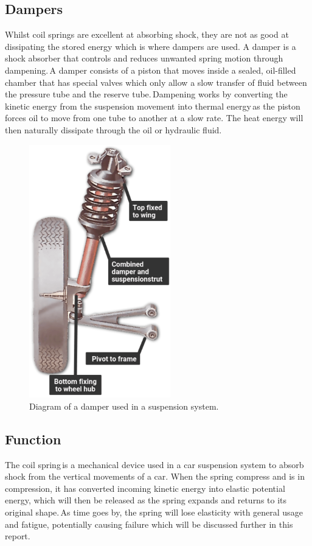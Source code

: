 \documentclass[11pt]{article}
\begin{document}
\subsection{Dampers}
Whilst coil springs are excellent at absorbing shock, they are not as good at dissipating the stored energy which is where dampers are used. A damper is a shock absorber that controls and reduces unwanted spring motion through dampening. A damper consists of a piston that moves inside a sealed, oil-filled chamber that has special valves which only allow a slow transfer of fluid between the pressure tube and the reserve tube. Dampening works by converting the kinetic energy from the suspension movement into thermal energy as the piston forces oil to move from one tube to another at a slow rate. The heat energy will then naturally dissipate through the oil or hydraulic fluid. 
\begin{figure}[H]
    \centering
    \includegraphics[height = 11cm]{./img/damper1.png}
    \caption{Diagram of a damper used in a suspension system.}
    \label{fig:damper1}
\end{figure}
\subsection{Function}
The coil spring is a mechanical device used in a car suspension system to absorb shock from the vertical movements of a car. When the spring compress and is in compression, it has converted incoming kinetic energy into elastic potential energy, which will then be released as the spring expands and returns to its original shape. As time goes by, the spring will lose elasticity with general usage and fatigue, potentially causing failure which will be discussed further in this report.  
\newpage
\end{document}
